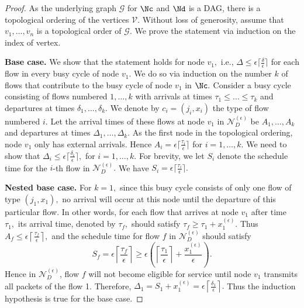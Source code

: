 \begin{proof}
	As the underlying graph $\mathcal{G}$ for $\Nc$ and $\Nd$ is a
	DAG, there is a topological ordering of the vertices $\mathcal{V}.$
	Without loss of generosity, assume that $v_{1},\ldots,v_{n}$ is a
	topological order of $\mathcal{G}.$ We prove the statement via induction
	on the index of vertex. 
	
	\textbf{Base case. }We show that the statement holds for node $v_{1},$
	i.e., $\Delta\leq\epsilon\lceil\frac{\delta}{\epsilon}\rceil$ for
	each flow in every busy cycle of node $v_{1}.$ We do so via induction
	on the number $ k $ of flows that contribute to the busy cycle of node $v_{1}$
	in $\Nc.$ Consider a busy cycle consisting of flows numbered $1,\ldots,k$
	with arrivals at times $\tau_{1}\leq\ldots\leq\tau_{k}$ and departures
	at times $\delta_{1},\ldots,\delta_{k}.$ We denote by $c_{i}=(j_{i},x_{i})$
	the type of flow numbered $i.$ Let the arrival times of these flows
	at node $v_{1}$ in $\mathcal{N}_{D}^{(\epsilon)}$ be $A_{1},\ldots,A_{k}$
	and departures at times $\Delta_{1},\ldots,\Delta_{k}.$ As the first
	node in the topological ordering, node $v_{1}$ only has external
	arrivals. Hence $A_{i}=\epsilon\lceil\frac{\tau_{i}}{\epsilon}\rceil$
	for $i=1,\ldots,k$. We need to show that $\Delta_{i}\leq\epsilon\lceil\frac{\delta_{i}}{\epsilon}\rceil,$
	for $i=1,\ldots,k.$ For brevity, we let $S_{i}$ denote the schedule
	time for the $i$-th flow in $\mathcal{N}_{D}^{(\epsilon)}.$ We have
	$S_{i}=\epsilon\lceil\frac{\tau_{i}}{\epsilon}\rceil.$
	
	\textbf{Nested base case. }For $k=1,$ since this busy cycle consists
	of only one flow of type $(j_{1},x_{1}),$ no arrival will occur at
	this node until the departure of this particular flow. In other words,
	for each flow that arrives at node $v_{1}$ after time $\tau_{1},$
	its arrival time, denoted by $\tau_{f},$ should satisfy $\tau_{f}\geq\tau_{1}+x_{1}^{(\epsilon)}.$
	Thus $A_{f}\leq\epsilon\left\lceil \frac{\tau_{f}}{\epsilon}\right\rceil ,$
	and the schedule time for flow $f$ in $\mathcal{N}_{D}^{(\epsilon)}$
	should satisfy 
	\[
	S_{f}=\epsilon\left\lceil \frac{\tau_{f}}{\epsilon}\right\rceil \geq\epsilon\left(\left\lceil \frac{\tau_{1}}{\epsilon}\right\rceil +\frac{x_{1}^{(\epsilon)}}{\epsilon}\right).
	\]
	Hence in $\mathcal{N}_{D}^{(\epsilon)}$, flow $f$ will not become
	eligible for service until node $v_{1}$ transmits all packets of
	the flow 1. Therefore, $\Delta_{1}=S_{1}+x_{1}^{(\epsilon)}=\epsilon\left\lceil \frac{\delta_{1}}{\epsilon}\right\rceil .$
	Thus the induction hypothesis is true for the base case.
	

\end{proof}
